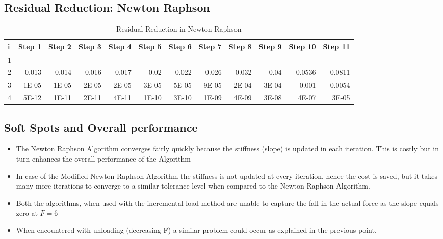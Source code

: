 \documentclass[11pt]{article}
\begin{document}
\subsection*{Residual Reduction: Newton Raphson}
\begin{table}[htbp]
  \centering
  \caption{Residual Reduction in Newton Raphson}
    \begin{tabular}{rrrrrrrrrrrr}
    \toprule
    \multicolumn{1}{l}{\textbf{i}} & \multicolumn{1}{l}{\textbf{Step 1}} & \multicolumn{1}{l}{\textbf{Step 2}} & \multicolumn{1}{l}{\textbf{Step 3}} & \multicolumn{1}{l}{\textbf{Step 4}} & \multicolumn{1}{l}{\textbf{Step 5}} & \multicolumn{1}{l}{\textbf{Step 6}} & \multicolumn{1}{l}{\textbf{Step 7}} & \multicolumn{1}{l}{\textbf{Step 8}} & \multicolumn{1}{l}{\textbf{Step 9}} & \multicolumn{1}{l}{\textbf{Step 10}} & \multicolumn{1}{l}{\textbf{Step 11}} \\
    \midrule
    1     &       &       &       &       &       &       &       &       &       &       &  \\
    2     & 0.013 & 0.014 & 0.016 & 0.017 & 0.02  & 0.022 & 0.026 & 0.032 & 0.04  & 0.0536 & 0.0811 \\
    3     & 1E-05 & 1E-05 & 2E-05 & 2E-05 & 3E-05 & 5E-05 & 9E-05 & 2E-04 & 3E-04 & 0.001 & 0.0054 \\
    4     & 5E-12 & 1E-11 & 2E-11 & 4E-11 & 1E-10 & 3E-10 & 1E-09 & 4E-09 & 3E-08 & 4E-07 & 3E-05 \\
    \bottomrule
    \end{tabular}%
  \label{tab:addlabel}%
\end{table}%
\newpage
\subsection*{Soft Spots and Overall performance}
\begin{itemize}
\item The Newton Raphson Algorithm converges fairly quickly because the stiffness (slope) is updated in each iteration. This is costly but in turn enhances the overall performance of the Algorithm
\item In case of the Modified Newton Raphson Algorithm the stiffness is not updated at every iteration, hence the cost is saved, but it takes many more iterations to converge to a similar tolerance level when compared to the Newton-Raphson Algorithm.
\item Both the algorithms, when used with the incremental load method are unable to capture the fall in the actual force as the slope equals zero at $F = 6$
\item When encountered with unloading (decreasing F) a similar problem could occur as explained in the previous point.
\end{itemize}
\end{document}
